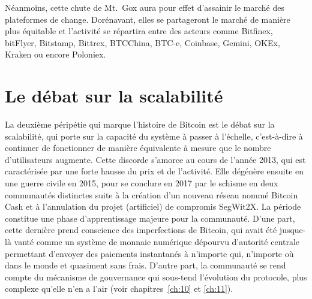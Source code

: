 Néanmoins, cette chute de Mt.~Gox aura pour effet d'assainir le marché des plateformes de change. Dorénavant, elles se partageront le marché de manière plus équitable et l'activité se répartira entre des acteurs comme Bitfinex, bitFlyer, Bitstamp, Bittrex, BTCChina, BTC-e, Coinbase, Gemini, OKEx, Kraken ou encore Poloniex.

\section*{Le débat sur la scalabilité} %

La deuxième péripétie qui marque l'histoire de Bitcoin est le débat sur la scalabilité, qui porte sur la capacité du système à passer à l'échelle, c'est-à-dire à continuer de fonctionner de manière équivalente à mesure que le nombre d'utilisateurs augmente. Cette discorde s'amorce au cours de l'année 2013, qui est caractérisée par une forte hausse du prix et de l'activité. Elle dégénère ensuite en une guerre civile en 2015, pour se conclure en 2017 par le schisme en deux communautés distinctes suite à la création d'un nouveau réseau nommé Bitcoin Cash et à l'annulation du projet (artificiel) de compromis SegWit2X. La période constitue une phase d'apprentissage majeure pour la communauté. D'une part, cette dernière prend conscience des imperfections de Bitcoin, qui avait été jusque-là vanté comme un système de monnaie numérique dépourvu d'autorité centrale permettant d'envoyer des paiements instantanés à n'importe qui, n'importe où dans le monde et quasiment sans frais. D'autre part, la communauté se rend compte du mécanisme de gouvernance qui sous-tend l'évolution du protocole, plus complexe qu'elle n'en a l'air (voir chapitres~\ref{ch:10} et \ref{ch:11}).

